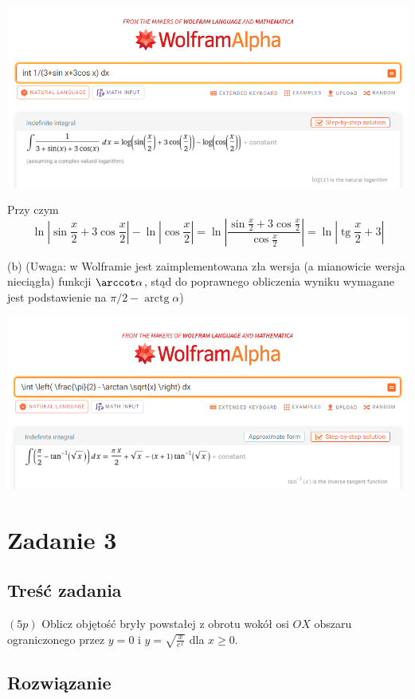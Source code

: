 \documentclass[12pt]{article}
\renewcommand{\tan}{\operatorname{tg}}
\renewcommand{\arctan}{\operatorname{arctg}}
\begin{document}
\includegraphics[scale=0.4]{am_2_a.png}

Przy czym
\[ \ln \left|\sin \frac{x}{2} + 3 \cos \frac{x}{2}\right| - \ln \left|\cos \frac{x}{2}\right| = \ln\left|\frac{\sin \frac{x}{2} + 3 \cos \frac{x}{2}}{\cos \frac{x}{2}}\right| = \ln\left|\tan \frac{x}{2} + 3 \right|\]

(b) (Uwaga: w Wolframie jest zaimplementowana zła wersja (a mianowicie wersja nieciągła) funkcji $\arccot \alpha$, stąd do poprawnego obliczenia wyniku wymagane jest podstawienie na $\pi/2 - \arctan \alpha$)

\includegraphics[scale=0.4]{am_2_b.png}

\section{Zadanie 3}
\subsection{Treść zadania}
$(5p)$ Oblicz objętość bryły powstałej z obrotu wokół osi $OX$ obszaru ograniczonego przez $y=0$ i $\displaystyle y=\sqrt{\frac{x}{e^x}}$ dla $x \geq 0$.

\subsection{Rozwiązanie}
\end{document}
